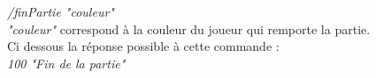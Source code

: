 \par

\textit{/finPartie "couleur"} \\

\textit{"couleur"} correspond à la couleur du joueur qui remporte la partie.\\

Ci dessous la réponse possible à cette commande : \\
\textit{100 "Fin de la partie"} \\
